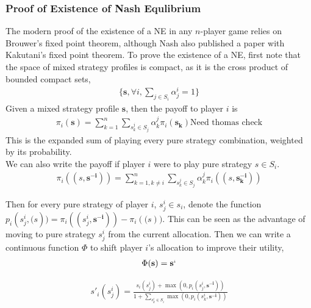\subsubsection{Proof of Existence of Nash Equlibrium}

The modern proof of the existence of a NE in any $n$-player game relies on Brouwer's fixed point theorem, although Nash also published a paper with Kakutani's fixed point theorem. To prove the existence of a NE, first note that the space of mixed strategy profiles is compact, as it is the cross product of bounded compact sets, \\
\begin{align*}
    \{ \mathbf{s}, \forall i, \sum_{j \in S_i} \alpha_j^i = 1 \}
\end{align*}
Given a mixed strategy profile $\mathbf{s}$, then the payoff to player $i$ is \\
\begin{align*}
    \pi_i(\mathbf{s}) = \sum_{k = 1}^n \sum_{s_k^j \in S_j} \alpha_k^j \pi_i(\mathbf{s_k}) \text{Need thomas check}
\end{align*}
This is the expanded sum of playing every pure strategy combination, weighted by its probability. \\
We can also write the payoff if player $i$ were to play pure strategy $s \in S_i$. \\
\begin{align*}
    \pi_i((s,\mathbf{s^{-i}})) = \sum_{k = 1, k \neq i}^n \sum_{s_k^j \in S_j} \alpha_k^j \pi_i((s,\mathbf{s_k^{-i}}))
\end{align*}

Then for every pure strategy of player $i$, $s_j^i \in s_i$, denote the function $p_i(s_j^i,\mathbf(s)) = \pi_i((s_j^i,\mathbf{s^{-i}})) - \pi_i(\mathbf(s))$. This can be seen as the advantage of moving to pure strategy $s_j^i$ from the current allocation. Then we can write a continuous function $\Phi$ to shift player $i$'s allocation to improve their utility, \\
\begin{align*}
    \Phi(\mathbf{s}) = \mathbf{s`} 
\end{align*}
    
\begin{align*}
    s'_i(s_j^i) = \frac{s_i(s_j^i) + \max{(0,p_i(s_j^i,\mathbf{s^{-i}}) )} }{1 + \sum_{s_k^i \in S_i} \max{(0,p_i(s_k^i,\mathbf{s^{-i}}) )}}
\end{align*}

